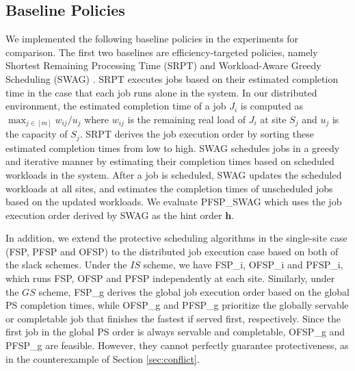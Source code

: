\subsection{Baseline Policies}
We implemented the following baseline policies in the experiments for comparison. The first two baselines are efficiency-targeted policies, namely Shortest Remaining Processing Time (SRPT) and Workload-Aware Greedy Scheduling (SWAG) \cite{hung2015scheduling}. SRPT executes jobs based on their estimated completion time in the case that each job runs alone in the system. In our distributed environment, the estimated completion time of a job $J_i$ is computed as $\max_{j \in[m]} w_{ij}/u_j$ where $w_{ij}$ is the remaining real load of $J_i$ at site $S_j$ and $u_j$ is the capacity of $S_j$. SRPT derives the job execution order by sorting these estimated completion times from low to high. SWAG schedules jobs in a greedy and iterative manner by estimating their completion times based on scheduled workloads in the system. After a job is scheduled, SWAG updates the scheduled workloads at all sites, and estimates the completion times of unscheduled jobs based on the updated workloads. We evaluate PFSP\_SWAG which uses the job execution order derived by SWAG as the hint order $\mathbf{h}$.

In addition, we extend the protective scheduling algorithms in the single-site case (FSP, PFSP and OFSP) to the distributed job execution case based on both of the slack schemes. Under the $IS$ scheme, we have FSP\_i, OFSP\_i and PFSP\_i, which runs FSP, OFSP and PFSP independently at each site. Similarly, under the $GS$ scheme, FSP\_g derives the global job execution order based on the global PS completion times, while OFSP\_g and PFSP\_g prioritize the globally servable or completable job that finishes the fastest if served first, respectively. Since the first job in the global PS order is always servable and completable, OFSP\_g and PFSP\_g are feasible. However, they cannot perfectly guarantee protectiveness, as in the counterexample of Section \ref{sec:conflict}. %

